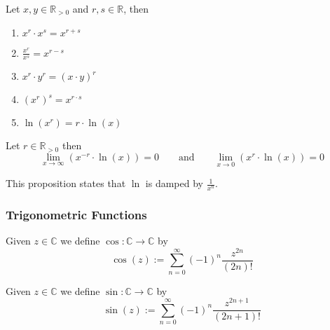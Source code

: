 \begin{proposition}
   Let \(x, y \in \mathbb{R}_{>0}\) and \(r, s \in \mathbb{R}\), then
   \begin{enumerate}[label=\roman*, align=Center]
      \item \(x^r \cdot x^s = x^{r + s}\)
      \item \(\frac{x^r}{x^s} = x^{r-s}\)
      \item \(x^r \cdot y^r = (x \cdot y)^r\)
      \item \((x^r)^s = x^{r \cdot s}\)
      \item \(\ln(x^r) = r \cdot \ln(x)\)
   \end{enumerate}
\end{proposition}

\begin{proposition}
   Let \(r \in \mathbb{R}_{>0}\) then
   \[\lim_{x \to \infty} \left(x^{-r} \cdot \ln(x)\right) = 0 \qquad\text{and}\qquad \lim_{x \to 0} \left(x^r \cdot \ln(x)\right) = 0\]
\end{proposition}
\begin{remark}
   This proposition states that \(\ln\) is damped by \(\frac{1}{x^n}\).
\end{remark}

\subsubsection{Trigonometric Functions}
\begin{definition}[Cosine]
   Given \(z \in \mathbb{C}\) we define \(\cos: \mathbb{C} \to \mathbb{C}\) by
   \[\cos(z) := \sum_{n=0}^\infty (-1)^n \frac{z^{2n}}{(2n)!}\]
\end{definition}

\begin{definition}[Sine]
   Given \(z \in \mathbb{C}\) we define \(\sin: \mathbb{C} \to \mathbb{C}\) by
   \[\sin(z) := \sum_{n=0}^\infty (-1)^n \frac{z^{2n + 1}}{(2n+1)!}\]
\end{definition}

